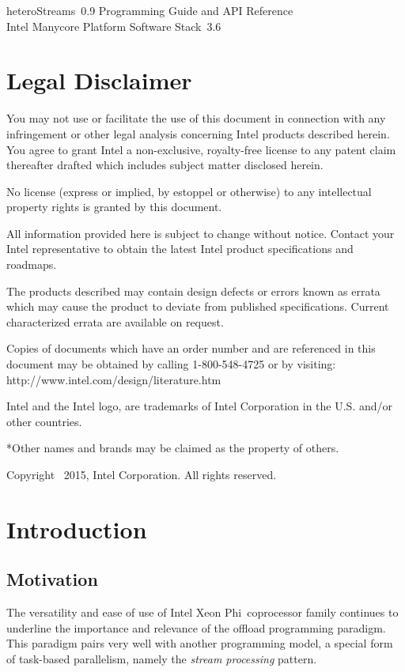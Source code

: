 \documentclass[a4,oneside]{book}
\newcommand{\ixp}{Intel\textregistered{} Xeon Phi\texttrademark{}}
\newcommand{\mpssFullName}{Intel\textregistered{} Manycore Platform Software Stack}
\newcommand{\heterostreams}{heteroStreams}
\begin{document}
\hypersetup{pageanchor=false}
\begin{titlepage}
\vspace*{7cm}
\begin{center}
    {\Large \heterostreams\ 0.9 Programming Guide and API Reference}\\[2em]
\mpssFullName\ 3.6
\end{center}
\end{titlepage}
\clearemptydoublepage
\chapter*{Legal Disclaimer}
You may not use or facilitate the use of this document in connection with any infringement or other legal analysis concerning Intel products described herein. You agree to grant Intel a non-exclusive, royalty-free license to any patent claim thereafter drafted which includes subject matter disclosed herein.

No license (express or implied, by estoppel or otherwise) to any intellectual property rights is granted by this document.

All information provided here is subject to change without notice. Contact your Intel representative to obtain the latest Intel product specifications and roadmaps.

The products described may contain design defects or errors known as errata which may cause the product to deviate from published specifications. Current characterized errata are available on request.

Copies of documents which have an order number and are referenced in this document may be obtained by calling 1-800-548-4725 or by visiting: http://www.intel.com/design/literature.htm

Intel and the Intel logo, are trademarks of Intel Corporation in the U.S. and/or other countries.

*Other names and brands may be claimed as the property of others.

Copyright \textcopyright\ 2015, Intel Corporation. All rights reserved.
\clearemptydoublepage

\tableofcontents
\clearemptydoublepage
{}
\hypersetup{pageanchor=true}

\chapter{Introduction}
\section{Motivation}
The versatility and ease of use of \ixp\ coprocessor family continues to underline the importance and relevance of the offload programming paradigm.
This paradigm pairs very well with another programming model, a special form of task-based parallelism, namely the \emph{stream processing} pattern.
\end{document}
